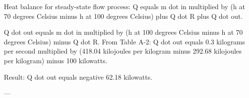 Heat balance for steady-state flow process:  
Q equals m dot in multiplied by (h at 70 degrees Celsius minus h at 100 degrees Celsius) plus Q dot R plus Q dot out.  

Q dot out equals m dot in multiplied by (h at 100 degrees Celsius minus h at 70 degrees Celsius) minus Q dot R.  
From Table A-2:  
Q dot out equals 0.3 kilograms per second multiplied by (418.04 kilojoules per kilogram minus 292.68 kilojoules per kilogram) minus 100 kilowatts.  

Result:  
Q dot out equals negative 62.18 kilowatts.  

---